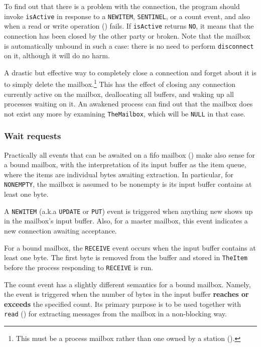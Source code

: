 To find out that there is a problem with the connection, the program should
invoke {\tt isActive} in response to a {\tt NEWITEM}, {\tt SENTINEL}, or
a count event, and also when a read or write operation ()
fails.
If {\tt isActive} returns {\tt NO}, it means that the connection has
been closed by the other party or broken.
Note that the mailbox is automatically unbound in such a case:
there is no need to perform {\tt disconnect} on it, although it will
do no harm.

A drastic but effective way to completely close a connection and forget about
it is to simply delete the mailbox.\footnote{This must be a process mailbox
rather than one owned by a station ().}
This has the effect of closing any connection currently active on the mailbox,
deallocating all buffers, and waking up all processes waiting on it.
An awakened process can find out that the mailbox does not exist any more
by examining {\tt TheMailbox}, which will be {\tt NULL} in that case.

\subsubsection{Wait requests}
\label{rm_mb_bo_wr}

Practically all events that can be awaited on a fifo mailbox
() make also sense for a bound mailbox, with the
interpretation of its input buffer as the item queue, where the items
are individual bytes awaiting extraction.
In particular, for {\tt NONEMPTY}, the mailbox is assumed to be nonempty
is its input buffer contains at least one byte.

A {\tt NEWITEM} (a.k.a {\tt UPDATE} or {\tt PUT})
event is triggered when anything new shows up in the mailbox's input
buffer.
Also, for a master mailbox, this event indicates a new connection awaiting
acceptance.

For a bound mailbox, the {\tt RECEIVE} event occurs when the input
buffer contains at least one byte.
The first byte is removed from the buffer and stored in {\tt TheItem}
before the process responding to {\tt RECEIVE} is run.

The count event has a slightly different semantics for a bound mailbox.
Namely, the event is triggered when the number of bytes in the input buffer
{\bf reaches or exceeds} the specified count.
Its primary purpose is to be used together with {\tt read} ()
for extracting messages from the mailbox in a non-blocking way.

